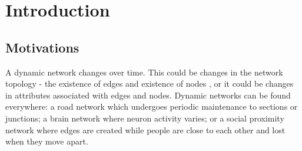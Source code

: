 
\chapter{Introduction}
\label{chap:introduction}
\ifpdf
    \graphicspath{{Introduction/Figures/PNG/}{Introduction/Figures/PDF/}{Introduction/Figures/}}
\else
    \graphicspath{{Introduction/Figures/EPS/}{Introduction/Figures/}}
\fi




\section{Motivations}
\label{motivations}
A dynamic network changes over time. This could be changes in the network topology - the existence of edges and existence of nodes \cite{itdn}, or it could be changes in attributes associated with edges and nodes. Dynamic networks can be found everywhere: a road network which undergoes periodic maintenance to sections or junctions; a brain network where neuron activity varies; or a social proximity network where edges are created while people are close to each other and lost when they move apart.

